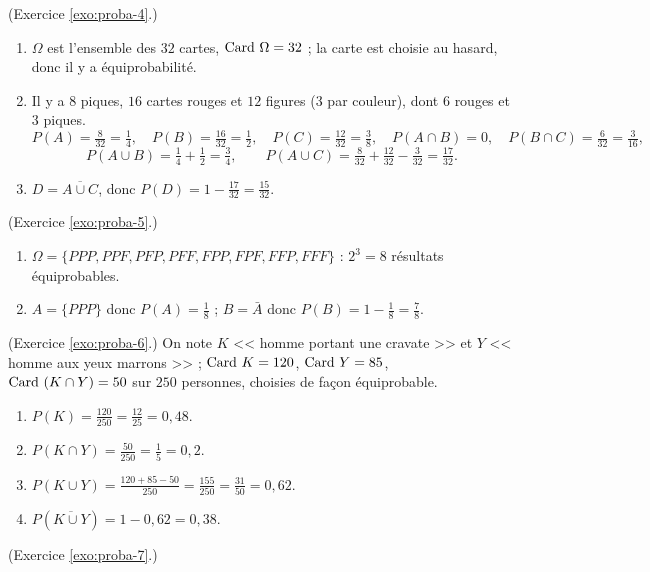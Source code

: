 \begin{corrige}
\begin{sol}
\begin{enumerate}
\end{enumerate}
\end{sol}
%
\begin{sol} (Exercice \ref{exo:proba-4}.)
\begin{enumerate}
\item $\Omega$ est l'ensemble des $32$ cartes, $\text{Card }\Omega = 32$ ; la carte est choisie au hasard, donc il y a \'equiprobabilit\'e.
\item Il y a $8$ piques, $16$ cartes rouges et $12$ figures (3 par couleur), dont $6$ rouges et $3$ piques.
      \[
      P(A) = \tfrac{8}{32} = \tfrac{1}{4},\quad P(B) = \tfrac{16}{32} = \tfrac{1}{2},\quad P(C) = \tfrac{12}{32} = \tfrac{3}{8},\quad
      P(A\cap B) = 0,\quad P(B\cap C) = \tfrac{6}{32} = \tfrac{3}{16},
      \]
      \[
      P(A\cup B) = \tfrac{1}{4} + \tfrac{1}{2} = \tfrac{3}{4},\qquad
      P(A\cup C) = \tfrac{8}{32} + \tfrac{12}{32} - \tfrac{3}{32} = \tfrac{17}{32}.
      \]
\item $D = \overline{A\cup C}$, donc $P(D) = 1 - \frac{17}{32} = \frac{15}{32}$.
\end{enumerate}
\end{sol}
%
\begin{sol} (Exercice \ref{exo:proba-5}.)
\begin{enumerate}
\item $\Omega = \{PPP, PPF, PFP, PFF, FPP, FPF, FFP, FFF\}$ : $2^3 = 8$ r\'esultats \'equiprobables.
\item $A = \{PPP\}$ donc $P(A) = \frac{1}{8}$ ; $B = \bar{A}$ donc $P(B) = 1 - \frac{1}{8} = \frac{7}{8}$.
\end{enumerate}
\end{sol}
%
\begin{sol} (Exercice \ref{exo:proba-6}.)
On note $K$ << homme portant une cravate >> et $Y$ << homme aux yeux marrons >> ;
$\text{Card }K = 120$, $\text{Card }Y = 85$, $\text{Card }(K\cap Y) = 50$ sur $250$ personnes, choisies de fa\c{c}on \'equiprobable.
\begin{enumerate}
\item $P(K) = \frac{120}{250} = \frac{12}{25} = 0,48$.
\item $P(K\cap Y) = \frac{50}{250} = \frac{1}{5} = 0,2$.
\item $P(K\cup Y) = \frac{120 + 85 - 50}{250} = \frac{155}{250} = \frac{31}{50} = 0,62$.
\item $P(\overline{K\cup Y}) = 1 - 0,62 = 0,38$.
\end{enumerate}
\end{sol}
%
\begin{sol} (Exercice \ref{exo:proba-7}.)

\end{sol}
\end{corrige}
